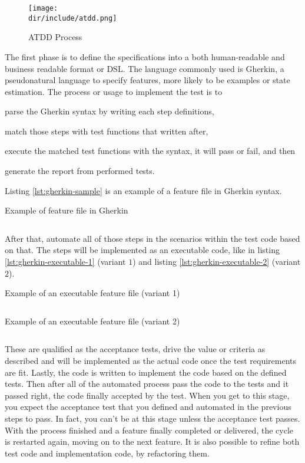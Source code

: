 \begin{figure}[!htb]
    \centering
    \texttt{[image: \\dir/include/atdd.png]}
    \caption{ATDD Process}
    \label{fig:atdd}
\end{figure}

The first phase is to define the specifications into a both human-readable and business readable format or \ac{DSL}.
The language commonly used is Gherkin, a pseudonatural language to specify features, more likely to be examples or state estimation.
The process or usage to implement the test is to
\begin{inparaenum}[\itshape 1\upshape)]
\item parse the Gherkin syntax by writing each step definitions,
\item match those steps with test functions that written after,
\item execute the matched test functions with the syntax, it will pass or fail, and then
\item generate the report from performed tests.
\end{inparaenum}

Listing \autoref{lst:gherkin-sample} is an example of a feature file in Gherkin syntax.

\begin{listing}[!htb]
\caption{Example of feature file in Gherkin}
\inputminted{ruby}{\dir/include/gherkin-sample.txt}
\label{lst:gherkin-sample}
\end{listing}

After that, automate all of those steps in the scenarios within the test code based on that.
The steps will be implemented as an executable code, like in listing \autoref{lst:gherkin-executable-1} (variant $1$) and listing \autoref{lst:gherkin-executable-2} (variant $2$).

\begin{listing}[!htb]
\caption{Example of an executable feature file (variant 1)}
\inputminted{javascript}{\dir/include/gherkin-executable-1.js}
\label{lst:gherkin-executable-1}
\end{listing}

\begin{listing}[!htb]
\caption{Example of an executable feature file (variant 2)}
\inputminted{javascript}{\dir/include/gherkin-executable-2.js}
\label{lst:gherkin-executable-2}
\end{listing}

These are qualified as the acceptance tests, drive the value or criteria as described and will be implemented as the actual code once the test requirements are fit.
Lastly, the code is written to implement the code based on the defined tests.
Then after all of the automated process pass the code to the tests and it passed right, the code finally accepted by the test.
When you get to this stage, you expect the acceptance test that you defined and automated in the previous steps to pass. In fact, you can't be at this stage unless the acceptance test passes.
With the process finished and a feature finally completed or delivered, the cycle is restarted again, moving on to the next feature.
It is also possible to refine both test code and implementation code, by refactoring them.
